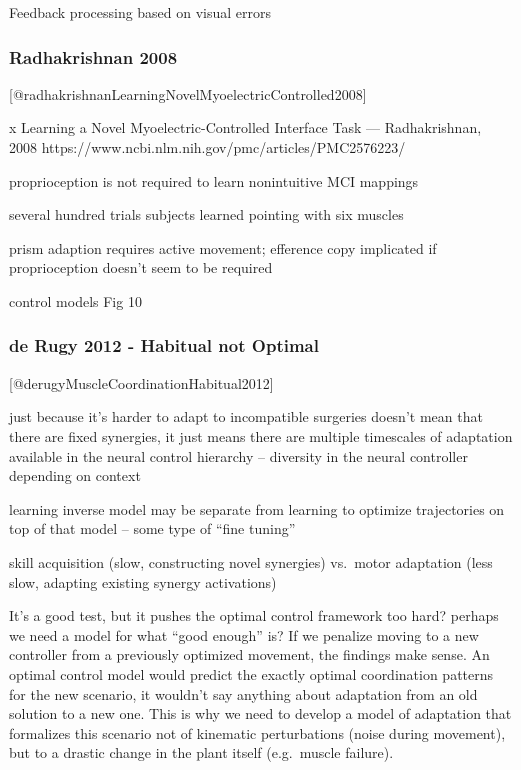 Feedback processing based on visual errors

\subsubsection{Radhakrishnan 2008}\label{radhakrishnan-2008}

{[}@radhakrishnanLearningNovelMyoelectricControlled2008{]}

x Learning a Novel Myoelectric-Controlled Interface Task ---
Radhakrishnan, 2008
https://www.ncbi.nlm.nih.gov/pmc/articles/PMC2576223/

proprioception is not required to learn nonintuitive MCI mappings

several hundred trials subjects learned pointing with six muscles

prism adaption requires active movement; efference copy implicated if
proprioception doesn't seem to be required

control models Fig 10

\subsubsection{de Rugy 2012 - Habitual not
Optimal}\label{de-rugy-2012---habitual-not-optimal}

{[}@derugyMuscleCoordinationHabitual2012{]}

just because it's harder to adapt to incompatible surgeries doesn't mean
that there are fixed synergies, it just means there are multiple
timescales of adaptation available in the neural control hierarchy --
diversity in the neural controller depending on context

learning inverse model may be separate from learning to optimize
trajectories on top of that model -- some type of ``fine tuning''

skill acquisition (slow, constructing novel synergies) vs.~motor
adaptation (less slow, adapting existing synergy activations)

It's a good test, but it pushes the optimal control framework too hard?
perhaps we need a model for what ``good enough'' is? If we penalize
moving to a new controller from a previously optimized movement, the
findings make sense. An optimal control model would predict the exactly
optimal coordination patterns for the new scenario, it wouldn't say
anything about adaptation from an old solution to a new one. This is why
we need to develop a model of adaptation that formalizes this scenario
not of kinematic perturbations (noise during movement), but to a drastic
change in the plant itself (e.g.~muscle failure).

